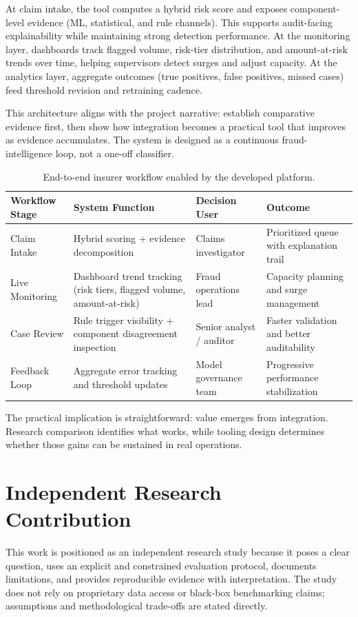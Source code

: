 \documentclass[12pt,a4paper]{report}
\begin{document}
At claim intake, the tool computes a hybrid risk score and exposes component-level evidence (ML, statistical, and rule channels). This supports audit-facing explainability while maintaining strong detection performance. At the monitoring layer, dashboards track flagged volume, risk-tier distribution, and amount-at-risk trends over time, helping supervisors detect surges and adjust capacity. At the analytics layer, aggregate outcomes (true positives, false positives, missed cases) feed threshold revision and retraining cadence.

This architecture aligns with the project narrative: establish comparative evidence first, then show how integration becomes a practical tool that improves as evidence accumulates. The system is designed as a continuous fraud-intelligence loop, not a one-off classifier.

\begin{table}[H]
\caption{End-to-end insurer workflow enabled by the developed platform.}
\label{tab:insurer_workflow_tooling}
\begin{tabular}{p{}p{}p{}p{}}
\toprule
\textbf{Workflow Stage} & \textbf{System Function} & \textbf{Decision User} & \textbf{Outcome} \\
\midrule
Claim Intake & Hybrid scoring + evidence decomposition & Claims investigator & Prioritized queue with explanation trail \\
Live Monitoring & Dashboard trend tracking (risk tiers, flagged volume, amount-at-risk) & Fraud operations lead & Capacity planning and surge management \\
Case Review & Rule trigger visibility + component disagreement inspection & Senior analyst / auditor & Faster validation and better auditability \\
Feedback Loop & Aggregate error tracking and threshold updates & Model governance team & Progressive performance stabilization \\
\bottomrule
\end{tabular}
\end{table}

The practical implication is straightforward: value emerges from integration. Research comparison identifies what works, while tooling design determines whether those gains can be sustained in real operations.

\section{Independent Research Contribution}
This work is positioned as an independent research study because it poses a clear question, uses an explicit and constrained evaluation protocol, documents limitations, and provides reproducible evidence with interpretation. The study does not rely on proprietary data access or black-box benchmarking claims; assumptions and methodological trade-offs are stated directly.
\end{document}

